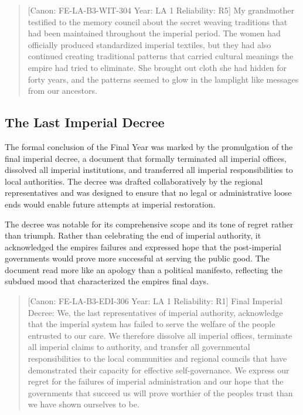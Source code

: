 \begin{quote}
{[}Canon: FE-LA-B3-WIT-304 \textbar{} Year: LA 1 \textbar{} Reliability:
R5{]} My grandmother testified to the memory council about the secret
weaving traditions that had been maintained throughout the imperial
period. The women had officially produced standardized imperial
textiles, but they had also continued creating traditional patterns that
carried cultural meanings the empire had tried to eliminate. She brought
out cloth she had hidden for forty years, and the patterns seemed to
glow in the lamplight like messages from our ancestors.
\end{quote}

\subsection{The Last Imperial Decree}\label{the-last-imperial-decree}

The formal conclusion of the Final Year was marked by the promulgation
of the final imperial decree, a document that formally terminated all
imperial offices, dissolved all imperial institutions, and transferred
all imperial responsibilities to local authorities. The decree was
drafted collaboratively by the regional representatives and was designed
to ensure that no legal or administrative loose ends would enable future
attempts at imperial restoration.

The decree was notable for its comprehensive scope and its tone of
regret rather than triumph. Rather than celebrating the end of imperial
authority, it acknowledged the empire\textquotesingle s failures and
expressed hope that the post-imperial governments would prove more
successful at serving the public good. The document read more like an
apology than a political manifesto, reflecting the subdued mood that
characterized the empire\textquotesingle s final days.

\begin{quote}
{[}Canon: FE-LA-B3-EDI-306 \textbar{} Year: LA 1 \textbar{} Reliability:
R1{]} Final Imperial Decree: We, the last representatives of imperial
authority, acknowledge that the imperial system has failed to serve the
welfare of the people entrusted to our care. We therefore dissolve all
imperial offices, terminate all imperial claims to authority, and
transfer all governmental responsibilities to the local communities and
regional councils that have demonstrated their capacity for effective
self-governance. We express our regret for the failures of imperial
administration and our hope that the governments that succeed us will
prove worthier of the people\textquotesingle s trust than we have shown
ourselves to be.
\end{quote}


